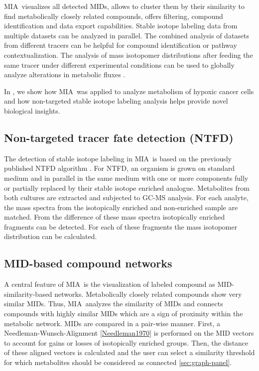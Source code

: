 \documentclass[a4paper,12pt]{scrartcl}
\newcommand*\app{\textsc{MIA}}
\begin{document}
\app\ visualizes all detected MIDs, allows to cluster them by their similarity to find metabolically closely related compounds, offers filtering, compound identification and data export capabilities. Stable isotope labeling data from multiple datasets can be analyzed in parallel. The combined analysis of datasets from different tracers can be helpful for compound identification or pathway contextualization. The analysis of mass isotopomer distributions after feeding the same tracer under different experimental conditions can be used to globally analyze alterations in metabolic fluxes \citep{Weindl2016}.

In \citep{Weindl2016}, we show how \app\ was applied to analyze metabolism of hypoxic cancer cells and how non-targeted stable isotope labeling analysis helps provide novel biological insights.


\subsection{Non-targeted tracer fate detection (NTFD)}
\label{sec:ntfd}

The detection of stable isotope labeling in \app\ is based on the previously published NTFD algorithm \cite{Hiller2010,Hiller2013,Weindl2015a}. For NTFD, an organism is grown on standard medium and in parallel in the same medium with one or more components fully or partially replaced by their stable isotope enriched analogue. Metabolites from both cultures are extracted and subjected to GC-MS analysis. For each analyte, the mass spectra from the isotopically enriched and non-enriched sample are matched. From the difference of these mass spectra isotopically enriched fragments can be detected. For each of these fragments the mass isotopomer distribution can be calculated.

\subsection{MID-based compound networks}
\label{sec:network}

A central feature of \app\ is the visualization of labeled compound as MID-similarity-based networks. Metabolically closely related compounds show very similar MIDs. Thus, \app\ analyzes the similarity of MIDs and connects compounds with highly similar MIDs which are a sign of proximity within the metabolic network. MIDs are compared in a pair-wise manner. First, a Needleman-Wunsch-Alignment \ref{Needleman1970} is performed on the MID vectors to account for gains or losses of isotopically enriched groups. Then, the distance of these aligned vectors is calculated and the user can select a similarity threshold for which metabolites should be considered as connected \ref{sec:graph-panel}. %
\end{document}
